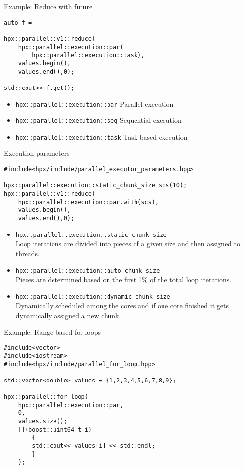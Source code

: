 \documentclass[\classoption]{beamer}
\begin{document}
\begin{frame}[fragile]{Example: Reduce with future}


\begin{lstlisting}
auto f =

hpx::parallel::v1::reduce(
	hpx::parallel::execution::par(
		hpx::parallel::execution::task),
	values.begin(),
	values.end(),0);

std::cout<< f.get();
\end{lstlisting}

\begin{itemize}
\item \lstinline|hpx::parallel::execution::par| Parallel execution
\item \lstinline|hpx::parallel::execution::seq| Sequential execution
\item \lstinline|hpx::parallel::execution::task| Task-based execution
\end{itemize}

\end{frame}


\begin{frame}[fragile]{Execution parameters}


\begin{lstlisting}
#include<hpx/include/parallel_executor_parameters.hpp>

hpx::parallel::execution::static_chunk_size scs(10);
hpx::parallel::v1::reduce(
	hpx::parallel::execution::par.with(scs),
	values.begin(),
	values.end(),0);
\end{lstlisting}

\begin{itemize}
\item \lstinline|hpx::parallel::execution::static_chunk_size| \\
Loop iterations are divided into pieces of a given size and then assigned to threads.
\item \lstinline|hpx::parallel::execution::auto_chunk_size| \\
Pieces are determined based on the first 1\% of the total loop iterations. 
\item \lstinline|hpx::parallel::execution::dynamic_chunk_size| \\
Dynamically scheduled among the cores and if one core finished it gets dynamically assigned a new chunk.
\end{itemize}

\end{frame}


\begin{frame}[fragile]{Example: Range-based for loops}


\begin{lstlisting}
#include<vector>
#include<iostream>
#include<hpx/include/parallel_for_loop.hpp>

std::vector<double> values = {1,2,3,4,5,6,7,8,9};

hpx::parallel::for_loop(
	hpx::parallel::execution::par, 
	0, 
	values.size();
	[](boost::uint64_t i)
		{
		std::cout<< values[i] << std::endl;
		}
	);
\end{lstlisting}

\end{frame}
\end{document}
